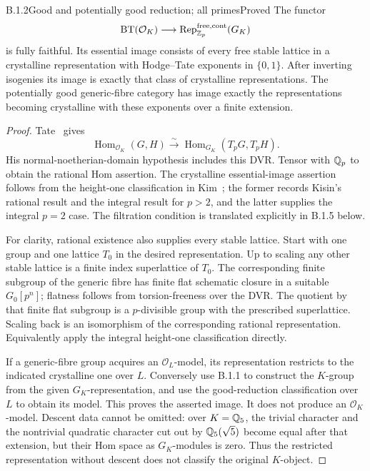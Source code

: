 \begin{result}{B.1.2}{Good and potentially good reduction; all primes}{Proved}
The functor
\[
 \operatorname{BT}(\mathcal O_K)\longrightarrow
                         \operatorname{Rep}_{\mathbb Z_p}^{\mathrm{free,cont}}(G_K)
\]
is fully faithful. Its essential image consists of every free
stable lattice in a crystalline representation with Hodge--Tate
exponents in $\{0,1\}$. After inverting isogenies its image is exactly
that class of crystalline representations. The potentially good
generic-fibre category has image exactly the representations
becoming crystalline with these exponents over a finite extension.
\end{result}
\begin{proof}
Tate~\cite[\S4.2, Theorem 4 and Corollary 1]{Tate1967} gives
\[
 \operatorname{Hom}_{\mathcal O_K}(G,H)
       \xrightarrow{\sim}\operatorname{Hom}_{G_K}(T_pG,T_pH).
\]
His normal-noetherian-domain hypothesis includes this DVR. Tensor
with $\mathbb Q_p$ to obtain the rational Hom assertion. The crystalline
essential-image assertion follows from the height-one classification
in Kim~\cite[Theorem 2.3 and Theorem 4.1]{Kim2012}; the former
records Kisin's rational result and the integral result for $p>2$,
and the latter supplies the integral $p=2$ case. The filtration
condition is translated explicitly in B.1.5 below.

For clarity, rational existence also supplies every stable lattice.
Start with one group and one lattice $T_0$ in the desired
representation. Up to scaling any other stable lattice is a finite
index superlattice of $T_0$. The corresponding finite subgroup of
the generic fibre has finite flat schematic closure in a suitable
$G_0[p^n]$; flatness follows from torsion-freeness over the DVR.
The quotient by that finite flat subgroup is a $p$-divisible group
with the prescribed superlattice. Scaling back is an isomorphism
of the corresponding rational representation. Equivalently apply
the integral height-one classification directly.

If a generic-fibre group acquires an $\mathcal O_L$-model, its
representation restricts to the indicated crystalline one over $L$.
Conversely use B.1.1 to construct the $K$-group from the given
$G_K$-representation, and use the good-reduction classification
over $L$ to obtain its model. This proves the asserted image.
It does not produce an $\mathcal O_K$-model. Descent data cannot
be omitted: over $K=\mathbb Q_5$, the trivial character and the
nontrivial quadratic character cut out by $\mathbb Q_5(\sqrt5)$ become
equal after that extension, but their Hom space as $G_K$-modules
is zero. Thus the restricted representation without descent
does not classify the original $K$-object.
\end{proof}

